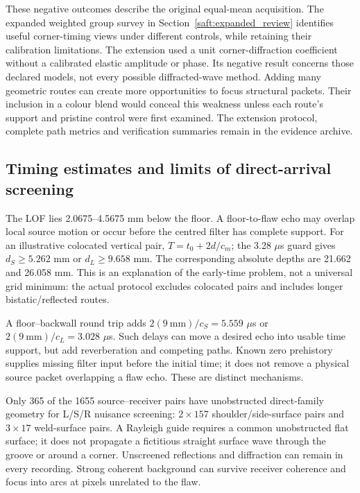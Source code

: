 \documentclass[11pt]{article}
\begin{document}
These negative outcomes describe the original equal-mean acquisition. The expanded weighted group survey in Section~\ref{saft:expanded_review} identifies useful corner-timing views under different controls, while retaining their calibration limitations. The extension used a unit corner-diffraction coefficient without a calibrated elastic amplitude or phase. Its negative result concerns those declared models, not every possible diffracted-wave method. Adding many geometric routes can create more opportunities to focus structural packets. Their inclusion in a colour blend would conceal this weakness unless each route's support and pristine control were first examined. The extension protocol, complete path metrics and verification summaries remain in the evidence archive.

\subsection{Timing estimates and limits of direct-arrival screening}
The LOF lies 2.0675--4.5675 mm below the floor. A floor-to-flaw echo may overlap local source motion or occur before the centred filter has complete support. For an illustrative colocated vertical pair, $T=t_0+2d/c_m$; the 3.28 $\mu$s guard gives $d_S\ge5.262$ mm or $d_L\ge9.658$ mm. The corresponding absolute depths are 21.662 and 26.058 mm. This is an explanation of the early-time problem, not a universal grid minimum: the actual protocol excludes colocated pairs and includes longer bistatic/reflected routes.

A floor--backwall round trip adds $2(9~\mathrm{mm})/c_S=5.559$ $\mu$s or $2(9~\mathrm{mm})/c_L=3.028$ $\mu$s. Such delays can move a desired echo into usable time support, but add reverberation and competing paths. Known zero prehistory supplies missing filter input before the initial time; it does not remove a physical source packet overlapping a flaw echo. These are distinct mechanisms.

Only 365 of the 1655 source--receiver pairs have unobstructed direct-family geometry for L/S/R nuisance screening: $2\times157$ shoulder/side-surface pairs and $3\times17$ weld-surface pairs. A Rayleigh guide requires a common unobstructed flat surface; it does not propagate a fictitious straight surface wave through the groove or around a corner. Unscreened reflections and diffraction can remain in every recording. Strong coherent background can survive receiver coherence and focus into arcs at pixels unrelated to the flaw.
\end{document}
